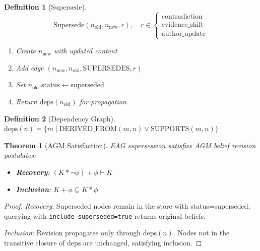 \documentclass[11pt,letterpaper]{article}
\newtheorem{definition}{Definition}[section]
\newtheorem{theorem}{Theorem}[section]
\begin{document}
\begin{definition}[Supersede]
\[
\text{Supersede}(n_{\text{old}}, n_{\text{new}}, r),
\quad
r \in
\begin{cases}
\text{contradiction}\\
\text{evidence\_shift}\\
\text{author\_update}
\end{cases}
\]
\begin{enumerate}[noitemsep]
    \item Create $n_{\text{new}}$ with updated content
    \item Add edge $(n_{\text{new}}, n_{\text{old}}, \text{SUPERSEDES}, r)$
    \item Set $n_{\text{old}}.\text{status} \gets \text{superseded}$
    \item Return $\text{deps}(n_{\text{old}})$ for propagation
\end{enumerate}
\end{definition}


\begin{definition}[Dependency Graph]
\label{def:deps}
$\text{deps}(n) = \{m \mid \text{DERIVED\_FROM}(m, n) \vee \text{SUPPORTS}(m, n)\}$
\end{definition}

\begin{theorem}[AGM Satisfaction]
\label{thm:agm}
EAG supersession satisfies AGM belief revision postulates:
\begin{itemize}[noitemsep]
    \item \textbf{Recovery}: $(K * \neg\phi) + \phi \vdash K$
    \item \textbf{Inclusion}: $K + \phi \subseteq K * \phi$
\end{itemize}
\end{theorem}

\begin{proof}
\textit{Recovery}: Superseded nodes remain in the store with status=superseded; querying with \texttt{include\_superseded=true} returns original beliefs.

\textit{Inclusion}: Revision propagates only through $\text{deps}(n)$. Nodes not in the transitive closure of $\text{deps}$ are unchanged, satisfying inclusion.
\end{proof}
\end{document}
